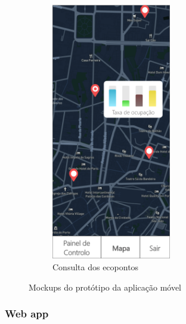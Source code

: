 \documentclass[11pt, a4paper, oneside]{book}
\begin{document}
\begin{appendices}
\begin{figure}[h!]
\begin{subfigure}[t]{0.33\textwidth}
        \centering
        \includegraphics[width=52mm]{img/mockups/tlmv-3.png}
        \caption{Consulta dos ecopontos}
    \end{subfigure}
    
    \caption{Mockups do protótipo da aplicação móvel}
\end{figure}

\newpage

\subsubsection{Web app}

\begin{figure}[h!]
    \centering
    

\end{figure}
\end{appendices}
\end{document}
